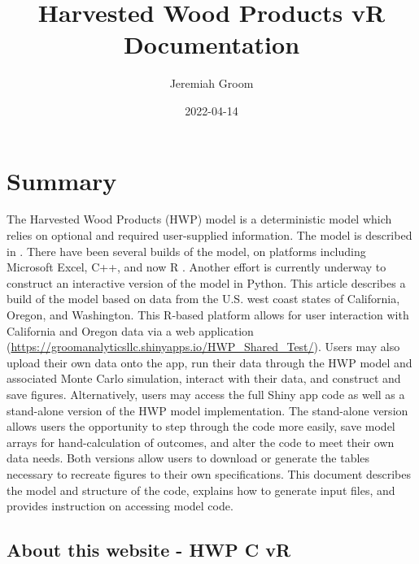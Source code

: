 \documentclass[
]{book}
\title{Harvested Wood Products vR Documentation}
\author{Jeremiah Groom}
\date{2022-04-14}
\begin{document}
\maketitle

{
\setcounter{tocdepth}{1}
\tableofcontents
}
\hypertarget{sum}{%
\chapter{Summary}\label{sum}}

The Harvested Wood Products (HWP) model is a deterministic model which relies on optional and required user-supplied information. The model is described in \citet{stockmann2012}. There have been several builds of the model, on platforms including Microsoft Excel, C++, and now R \citep{R-base}. Another effort is currently underway to construct an interactive version of the model in Python. This article describes a build of the model based on data from the U.S. west coast states of California, Oregon, and Washington. This R-based platform allows for user interaction with California and Oregon data via a web application (\url{https://groomanalyticsllc.shinyapps.io/HWP_Shared_Test/}). Users may also upload their own data onto the app, run their data through the HWP model and associated Monte Carlo simulation, interact with their data, and construct and save figures. Alternatively, users may access the full Shiny app code as well as a stand-alone version of the HWP model implementation. The stand-alone version allows users the opportunity to step through the code more easily, save model arrays for hand-calculation of outcomes, and alter the code to meet their own data needs. Both versions allow users to download or generate the tables necessary to recreate figures to their own specifications.
This document describes the model and structure of the code, explains how to generate input files, and provides instruction on accessing model code.

\hypertarget{sum-about}{%
\section{About this website - HWP C vR}\label{sum-about}}
\end{document}
